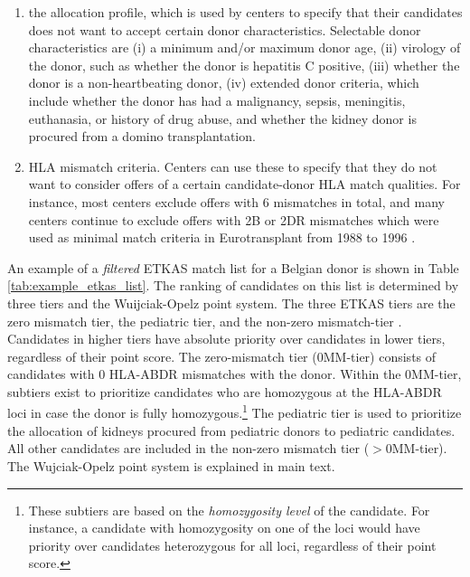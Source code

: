\begin{enumerate}[noitemsep]
	\item the allocation profile, which is used by centers to specify that their candidates does not want to accept certain donor characteristics. Selectable donor characteristics are (i) a minimum and/or maximum donor age, (ii) virology of the donor, such as whether the donor is hepatitis C positive, (iii) whether the donor is a non-heartbeating donor, (iv) extended donor criteria, which include whether the donor has had a malignancy, sepsis, meningitis, euthanasia, or history of drug abuse, and whether the kidney donor is procured from a domino transplantation.
	\item HLA mismatch criteria. Centers can use these to specify that they do not want to consider offers of a certain candidate-donor HLA match qualities. For instance, most centers exclude offers with 6 mismatches in total, and many centers continue to exclude offers with 2B or 2DR mismatches which were used as minimal match criteria in Eurotransplant from 1988 to 1996 \cite{demeesterNewEurotransplantKidney1998}.
\end{enumerate}
\par
An example of a \textit{filtered} ETKAS match list for a Belgian donor is shown in Table \ref{tab:example_etkas_list}. The ranking of candidates on this list is determined by three tiers and the Wuijciak-Opelz point system. The three ETKAS tiers are the zero mismatch tier, the pediatric tier, and the non-zero mismatch-tier \cite{manualKidney}. Candidates in higher tiers have absolute priority over candidates in lower tiers, regardless of their point score. The zero-mismatch tier (0MM-tier) consists of candidates with 0 HLA-ABDR mismatches with the donor. Within the 0MM-tier, subtiers exist to prioritize candidates who are homozygous at the HLA-ABDR loci in case the donor is fully homozygous.\footnote{These subtiers are based on the \textit{homozygosity level} of the candidate. For instance, a candidate with homozygosity on one of the loci would have priority over candidates heterozygous for all loci, regardless of their point score.} The pediatric tier is used to prioritize the allocation of kidneys procured from pediatric donors to pediatric candidates. All other candidates are included in the non-zero mismatch tier ($>$0MM-tier). The Wujciak-Opelz point system is explained in main text.
